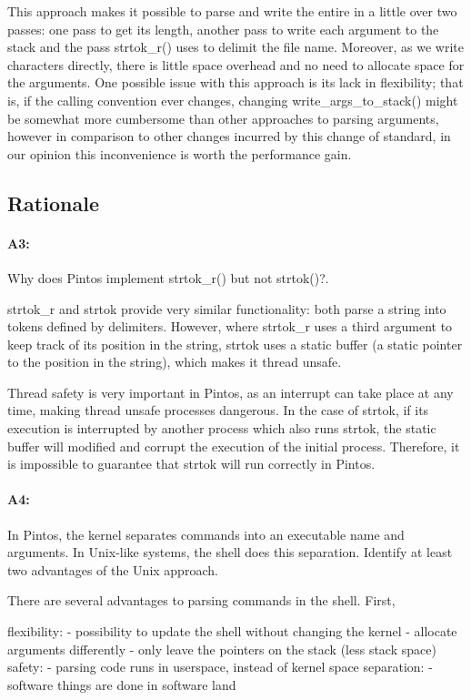 This approach makes it possible to parse and write the entire in a little over two passes: one pass to get its length, another pass to write each argument to the stack and the pass strtok\_r() uses to delimit the file name.
Moreover, as we write characters directly, there is little space overhead and no need to allocate space for the arguments.
One possible issue with this approach is its lack in flexibility; that is, if the calling convention ever changes, changing write\_args\_to\_stack() might be somewhat more cumbersome than other approaches to parsing arguments, however in comparison to other changes incurred by this change of standard, in our opinion this inconvenience is worth the performance gain.

\subsection{Rationale}
\paragraph{A3:} %
Why does Pintos implement strtok\_r() but not strtok()?.

strtok\_r and strtok provide very similar functionality: both parse a string into tokens defined by delimiters.
However, where strtok\_r uses a third argument to keep track of its position in the string, strtok uses a static buffer (a static pointer to the position in the string), which makes it thread unsafe.

Thread safety is very important in Pintos, as an interrupt can take place at any time, making thread unsafe processes dangerous. In the case of strtok, if its execution is interrupted by another process which also runs strtok, the static buffer will modified and corrupt the execution of the initial process. Therefore, it is impossible to guarantee that strtok will run correctly in Pintos.

\paragraph{A4:} %
In Pintos, the kernel separates commands into an executable name and arguments.  In Unix-like systems, the shell does this separation.  Identify at least two advantages of the Unix approach.

There are several advantages to parsing commands in the shell.
First, 

flexibility:
- possibility to update the shell without changing the kernel
- allocate arguments differently - only leave the pointers on the stack (less stack space)
safety:
- parsing code runs in userspace, instead of kernel space
separation:
- software things are done in software land

